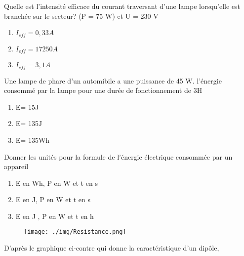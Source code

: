 \documentclass[12pt]{article}
\begin{document}
\begin{multicols}{2}
\begin{enumerate}
	\item Quelle est l'intensité efficace du courant traversant
d'une lampe lorsqu'elle est branchée sur le
secteur? (P = 75 W) et U = 230 V 
\begin{enumerate}
	\item $I_{eff} = 0,33A$
	\item $I_{eff} = 17250A$
	\item $I_{eff} = 3,1A$
\end{enumerate}
\item Une lampe de phare d'un automibile a une puissance de 45 W. l'énergie consommé par la lampe pour une durée de fonctionnement
de 3H
\begin{enumerate}
	\item E= 15J
	\item E= 135J
	\item E= 135Wh
\end{enumerate}
\item Donner les unités pour la formule de l'énergie
électrique consommée par un appareil 
\begin{enumerate}
	\item  E en Wh, P en W et t en s
	\item E en J, P en W et t en s 
	\item  E en J , P en W et t en h
\end{enumerate}

\begin{minipage}{\linewidth} 
\begin{wrapfigure}{r}{2.2in} 
\vspace{-1cm} 
\texttt{[image: ./img/Resistance.png]}
\end{wrapfigure} 


\item D’après le graphique ci-contre qui donne la caractéristique d’un dipôle,
\end{minipage}
\begin{enumerate}
	\vspace{0.5cm}


\end{enumerate}
\end{enumerate}
\end{multicols}
\end{document}
